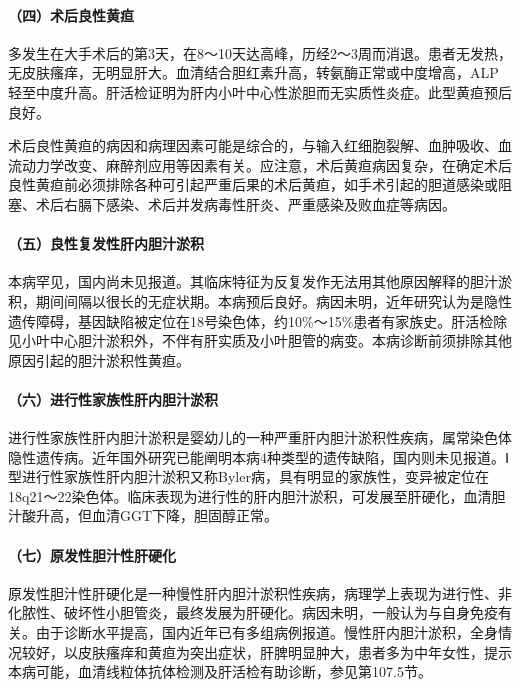 \paragraph{（四）术后良性黄疸}

多发生在大手术后的第3天，在8～10天达高峰，历经2～3周而消退。患者无发热，无皮肤瘙痒，无明显肝大。血清结合胆红素升高，转氨酶正常或中度增高，ALP轻至中度升高。肝活检证明为肝内小叶中心性淤胆而无实质性炎症。此型黄疸预后良好。

术后良性黄疸的病因和病理因素可能是综合的，与输入红细胞裂解、血肿吸收、血流动力学改变、麻醉剂应用等因素有关。应注意，术后黄疸病因复杂，在确定术后良性黄疸前必须排除各种可引起严重后果的术后黄疸，如手术引起的胆道感染或阻塞、术后右膈下感染、术后并发病毒性肝炎、严重感染及败血症等病因。

\paragraph{（五）良性复发性肝内胆汁淤积}

本病罕见，国内尚未见报道。其临床特征为反复发作无法用其他原因解释的胆汁淤积，期间间隔以很长的无症状期。本病预后良好。病因未明，近年研究认为是隐性遗传障碍，基因缺陷被定位在18号染色体，约10\%～15\%患者有家族史。肝活检除见小叶中心胆汁淤积外，不伴有肝实质及小叶胆管的病变。本病诊断前须排除其他原因引起的胆汁淤积性黄疸。

\paragraph{（六）进行性家族性肝内胆汁淤积}

进行性家族性肝内胆汁淤积是婴幼儿的一种严重肝内胆汁淤积性疾病，属常染色体隐性遗传病。近年国外研究已能阐明本病4种类型的遗传缺陷，国内则未见报道。Ⅰ型进行性家族性肝内胆汁淤积又称Byler病，具有明显的家族性，变异被定位在18q21～22染色体。临床表现为进行性的肝内胆汁淤积，可发展至肝硬化，血清胆汁酸升高，但血清GGT下降，胆固醇正常。

\paragraph{（七）原发性胆汁性肝硬化}

原发性胆汁性肝硬化是一种慢性肝内胆汁淤积性疾病，病理学上表现为进行性、非化脓性、破坏性小胆管炎，最终发展为肝硬化。病因未明，一般认为与自身免疫有关。由于诊断水平提高，国内近年已有多组病例报道。慢性肝内胆汁淤积，全身情况较好，以皮肤瘙痒和黄疸为突出症状，肝脾明显肿大，患者多为中年女性，提示本病可能，血清线粒体抗体检测及肝活检有助诊断，参见第107.5节。

